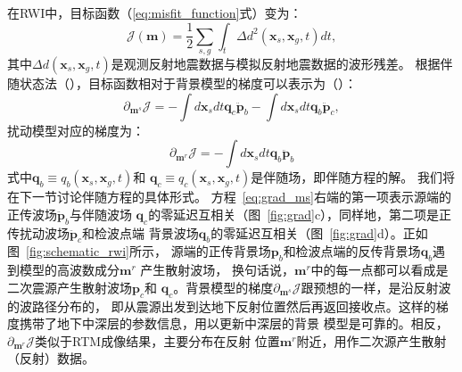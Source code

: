 在RWI中，目标函数（\ref{eq:misfit_function}式）变为：
\begin{equation}
    \mathcal{J}(\mathbf{m})=\frac{1}{2}\sum_{s,g}\int_t\Delta d^2(\mathbf{x}_s,\mathbf{x}_g,t)dt,
	\label{eq:misfit_function1}
\end{equation}
其中$\Delta d(\mathbf{x}_s,\mathbf{x}_g,t)$是观测反射地震数据与模拟反射地震数据的波形残差。
根据伴随状态法（），目标函数相对于背景模型的梯度可以表示为（）：
\begin{equation}
	\partial_{\mathbf{m}^s}\mathcal{J}=-\int d\mathbf{x}_sdt\mathbf{q}_c\ddot{\mathbf{p}}_b
	-\int d\mathbf{x}_sdt\mathbf{q}_b\ddot{\mathbf{p}}_c,
	\label{eq:grad_ms}
\end{equation}
扰动模型对应的梯度为：
\begin{equation}
	\partial_{\mathbf{m}^r}\mathcal{J}=-\int d\mathbf{x}_sdt\mathbf{q}_b\ddot{\mathbf{p}}_b
\end{equation}
式中$\mathbf{q}_b\equiv q_b(\mathbf{x}_s,\mathbf{x}_g,t)$和
$\mathbf{q}_c\equiv q_c(\mathbf{x}_s,\mathbf{x}_g,t)$是伴随场，即伴随方程的解。
我们将在下一节讨论伴随方程的具体形式。
方程~\ref{eq:grad_ms}右端的第一项表示源端的正传波场$\ddot{\mathbf{p}}_b$与伴随波场
$\mathbf{q}_c$的零延迟互相关（图~\ref{fig:grad}c），同样地，第二项是正传扰动波场$\ddot{\mathbf{p}}_c$和检波点端
背景波场$\mathbf{q}_b$的零延迟互相关（图~\ref{fig:grad}d）。正如图~\ref{fig:schematic_rwi}所示，
源端的正传背景场$\mathbf{p}_b$和检波点端的反传背景场$\mathbf{q}_b$遇到模型的高波数成分$\mathbf{m}^r$
产生散射波场，
换句话说，$\mathbf{m}^r$中的每一点都可以看成是二次震源产生散射波场$\mathbf{p}_c$和
$\mathbf{q}_c$。背景模型的梯度$\partial_{\mathbf{m}^s}\mathcal{J}$跟预想的一样，是沿反射波的波路径分布的，
即从震源出发到达地下反射位置然后再返回接收点。这样的梯度携带了地下中深层的参数信息，用以更新中深层的背景
模型是可靠的。相反，$\partial_{\mathbf{m}^r}\mathcal{J}$类似于RTM成像结果，主要分布在反射
位置$\mathbf{m}^r$附近，用作二次源产生散射（反射）数据。

